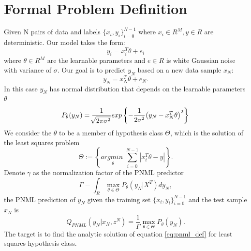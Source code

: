 \documentclass[letterpaper, 10 pt, conference]{ieeeconf}  %
\begin{document}
\section{Formal Problem Definition} \label{sec:formal_problem_def}
Given N pairs of data and labels $\{x_i, y_i\}_{i=0}^{N-1}$ where $x_i \in R^M, y\in R$ are deterministic. Our model takes the form:
\begin{equation}
y_i=x_i^T \theta + e_i
\end{equation}
where $\theta \in R^M$ are the learnable parameters and $e \in R$ is white Gaussian noise with variance of $\sigma$. 
Our goal is to predict $y_N$ based on a new data sample $x_N$:
\begin{equation}
y_N = x_N^T \theta + e_N.
\end{equation}
In this case $y_N$ has normal distribution that depends on the learnable parameters $\theta$ 
\begin{equation}
P_{\theta}(y_N) 
=\frac{1}{\sqrt[]{2\pi\sigma^2}}exp\left\{-\frac{1}{2\sigma^2}\big(y_N- x_N^T\theta \big)^2\right\}  \\
\end{equation}
We consider the $\theta$ to be a member of hypothesis class $\Theta$, which is the solution of the least squares problem
\begin{equation}
\Theta := \left\{ \underset{\theta}{\textit{argmin }} \sum_{i=0}^{N-1} | x^T_i \theta - y | \right\}.
\end{equation}
Denote $\gamma$ as the normalization factor of the PNML predictor
\begin{equation}
\Gamma=\int_R \max_{\theta \in \Theta} P_\theta(y_N|X^T)dy_N,   
\end{equation}
the PNML prediction of $y_N$ given the training set $\{x_i,y_i\}_{i=0}^{N-1}$ and the test sample $x_N$ is
\begin{equation} \label{eq:pnml_def}
Q_{\textit{PNML}}(y_N|x_N,z^N) = \frac{1}{\Gamma} \max_{\theta \in \Theta} P_\theta(y_N).
\end{equation}
The target is to find the analytic solution of equation \ref{eq:pnml_def} for least squares hypothesis class.
\end{document}
